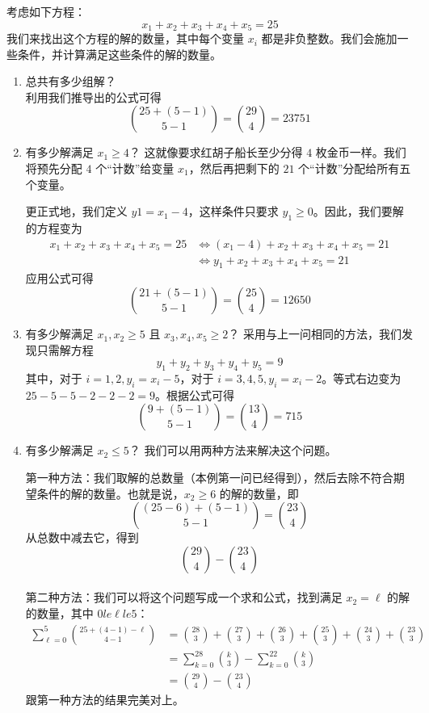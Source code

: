 \begin{example}
      考虑如下方程：
      \[x_1 + x_2 + x_3 + x_4 + x_5 = 25\]
      我们来找出这个方程的解的数量，其中每个变量 $x_i$ 都是非负整数。我们会施加一些条件，并计算满足这些条件的解的数量。
      \begin{enumerate}[label=(\arabic*)]
            \item 总共有多少组解？\\
                  利用我们推导出的公式可得
                  \[{25+(5-1) \choose 5-1}={29 \choose 4}=23751\]
            \item 有多少解满足 $x_1 \ge 4$？
                  这就像要求红胡子船长至少分得 $4$ 枚金币一样。我们将预先分配 $4$ 个``计数''给变量 $x_1$，然后再把剩下的 $21$ 个``计数''分配给所有五个变量。

                  更正式地，我们定义 $y1 = x_1 - 4$，这样条件只要求 $y_1 \ge 0$。因此，我们要解的方程变为
                  \begin{align*}
                        x_1 + x_2 + x_3 + x_4 + x_5 = 25 & \iff (x_1-4) + x_2 + x_3 + x_4 + x_5 = 21 \\
                                                         & \iff y_1 + x_2 + x_3 + x_4 + x_5 = 21
                  \end{align*}
                  应用公式可得
                  \[{21+(5-1) \choose 5-1}={25 \choose 4}=12650\]
            \item 有多少解满足 $x_1, x_2 \ge 5$ 且 $x_3, x_4, x_5 \ge 2$？
                  采用与上一问相同的方法，我们发现只需解方程
                  \[y_1 + y_2 + y_3 + y_4 + y_5 = 9\]
                  其中，对于 $i=1,2, y_i = x_i-5$，对于 $i=3,4,5, y_i = x_i-2$。等式右边变为 $25 - 5 - 5 - 2 - 2 - 2 = 9$。根据公式可得
                  \[{9 +(5-1) \choose 5-1} = {13 \choose 4}=715\]
            \item 有多少解满足 $x_2 \le 5$？
                  我们可以用两种方法来解决这个问题。

                  第一种方法：我们取解的总数量（本例第一问已经得到），然后去除不符合期望条件的解的数量。也就是说，$x_2 \ge 6$ 的解的数量，即
                  \[{(25-6)+(5-1) \choose 5-1}={23 \choose 4}\]
                  从总数中减去它，得到
                  \[{29 \choose 4}-{23 \choose 4}\] \\

                  第二种方法：我们可以将这个问题写成一个求和公式，找到满足 $x_2 = \ell$ 的解的数量，其中 $0 le \ell le 5$：
                  \begin{align*}
                        \sum_{\ell=0}^{5} {25+(4-1)-\ell \choose 4-1} & = {28 \choose 3}+{27 \choose 3}+{26 \choose 3}+{25 \choose 3}+{24 \choose 3}+{23 \choose 3} \\
                                                                      & = \sum_{k=0}^{28}{k \choose 3}-\sum_{k=0}^{22}{k \choose 3}                                 \\
                                                                      & = {29 \choose 4}-{23 \choose 4}
                  \end{align*}
                  跟第一种方法的结果完美对上。
      \end{enumerate}
\end{example}